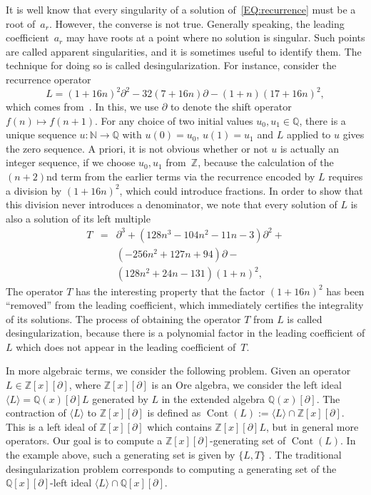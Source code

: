 \documentclass[10pt,a4paper]{article}
\newcommand{\bN}{ {\mathbb  N}}
\newcommand{\bZ} { {\mathbb Z}}
\newcommand{\bQ}{ {\mathbb  Q}}
\newcommand{\pa}{ {\partial}}
\newcommand{\cont}{\operatorname{Cont}}
\begin{document}
It is well know that every singularity of a solution of~\eqref{EQ:recurrence} 
must be a root of~$a_r$. However, the converse is not true.
Generally speaking, the leading coefficient~$a_r$ may have roots at a point where no solution is singular. 
Such points are called
apparent singularities, and it is sometimes useful to
identify them. The technique for doing so is called desingularization.
For instance, consider the recurrence operator
\[
 L = (1 + 16 n)^2 \pa^2 - 32 (7 + 16 n) \pa - (1 + n)(17 + 16 n)^2,
\]
which comes from~\cite[Section 4.1]{Abramov2006}. 
In this, we use $\pa$ to denote the shift operator $f(n) \mapsto f(n + 1)$.
For any choice of two initial values
$u_0,u_1\in  \bQ$, there is a unique sequence $u \colon
\bN \to \bQ$ with $u(0)=u_0$, $u(1)=u_1$ and $L$ applied to $u$
gives the zero sequence. A priori, it is not obvious whether or
not $u$ is actually an integer sequence, if we choose $u_0,u_1$
from~$\bZ$, because the calculation of the $(n+2)$nd term
from the earlier terms via the recurrence encoded by $L$ requires
a division by $(1+16n)^2$, which could introduce fractions. In order
to show that this division never introduces a denominator, 
we note that every solution of $L$ is also a solution
of its left multiple
\begin{equation} \label{EQ:ah}
\begin{array}{ccl}
T  & = & \pa^3 +\left(128 n^3-104 n^2-11 n-3\right) \pa^2 + \\
          &   & \left(-256 n^2+127 n + 94 \right) \pa - \\
          &   & (128 n^2+24 n-131)(1 + n)^2,
\end{array}
\end{equation}
The operator $T$ has the interesting property that the factor
$(1+16n)^2$ has been ``removed'' from the leading
coefficient, which immediately certifies the integrality of its solutions. 
The process of obtaining the operator $T$ from $L$ is called
desingularization, because there is a polynomial factor in the
leading coefficient of $L$ which does not appear in the leading
coefficient of~$T$. 


In more algebraic terms, we consider the following problem. Given
an operator $L\in \bZ[x][\pa]$, where $\bZ[x][\pa]$
is an Ore algebra, we consider
the left ideal $\langle L \rangle = \bQ(x)[\pa]L$ generated by $L$ in the
extended algebra $\bQ(x)[\pa]$. The contraction of $\langle L \rangle$ to
$\bZ[x][\pa]$ is defined as $\cont(L) := \langle L \rangle \cap
\bZ[x][\pa]$. This is a left ideal of $\bZ[x][\pa]$ which
contains $\bZ[x][\pa]L$, but in general more operators.
Our goal is to compute a $\bZ[x][\pa]$-generating set of $\cont(L)$.
In the example above, such a generating set is given by $\{L, T\}$ 	.
The traditional desingularization problem corresponds to computing
a generating set of the $\bQ[x][\pa]$-left ideal $\langle L \rangle \cap \bQ[x][\pa]$.
\end{document}
